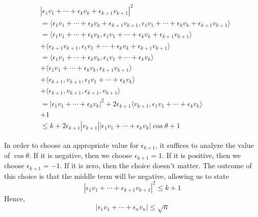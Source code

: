 \documentclass[letterpaper,11pt]{article}
\begin{document}
\begin{enumerate}
        \begin{align*}
            &
            |
            \epsilon_1 v_1 + \cdots + \epsilon_k v_k + \epsilon_{k+1} v_{k+1}
            |^2 \\
            &=
            \langle
            \epsilon_1 v_1 + \cdots + \epsilon_k v_k + \epsilon_{k+1} v_{k+1},
            \epsilon_1 v_1 + \cdots + \epsilon_k v_k + \epsilon_{k+1} v_{k+1}
            \rangle \\
            &=
            \langle
            \epsilon_1 v_1 + \cdots + \epsilon_k v_k,
            \epsilon_1 v_1 + \cdots + \epsilon_k v_k + \epsilon_{k+1} v_{k+1}
            \rangle \\
            &+
            \langle
            \epsilon_{k+1} v_{k+1},
            \epsilon_1 v_1 + \cdots + \epsilon_k v_k + \epsilon_{k+1} v_{k+1}
            \rangle \\
            &=
            \langle
            \epsilon_1 v_1 + \cdots + \epsilon_k v_k,
            \epsilon_1 v_1 + \cdots + \epsilon_k v_k
            \rangle \\
            &+
            \langle
            \epsilon_1 v_1 + \cdots + \epsilon_k v_k,
            \epsilon_{k+1} v_{k+1}
            \rangle \\
            &+
            \langle
            \epsilon_{k+1}, v_{k+1},
            \epsilon_1 v_1 + \cdots + \epsilon_k v_k
            \rangle \\
            &+
            \langle
            \epsilon_{k+1}, v_{k+1},
            \epsilon_{k+1}, v_{k+1}
            \rangle \\
            &=
            |\epsilon_1 v_1 + \cdots + \epsilon_k v_k|^2
            +
            2 \epsilon_{k+1}
            \langle
            v_{k+1}, \epsilon_1 v_1 + \cdots + \epsilon_k v_k
            \rangle \\
            &+
            1 \\
            &\leq
            k
            +
            2 \epsilon_{k+1}
            |v_{k+1}| |\epsilon_1 v_1 + \cdots + \epsilon_k v_k| \cos \theta
            +
            1
        \end{align*}

        In order to choose an appropriate value for $\epsilon_{k+1}$, it
        suffices to analyze the value of $\cos \theta$. If it is negative, then
        we choose $\epsilon_{k+1} = 1$. If it is positive, then we choose
        $\epsilon_{k+1} = -1$. If it is zero, then the choice doesn't matter.
        The outcome of this choice is that the middle term will be negative,
        allowing us to state
        $$
        |\epsilon_1 v_1 + \cdots + \epsilon_{k+1} v_{k+1}|^2 \leq k + 1
        $$
        Hence,
        $$
        |\epsilon_1 v_1 + \cdots + \epsilon_n v_n| \leq \sqrt{n}
        $$
\end{enumerate}
\end{document}

